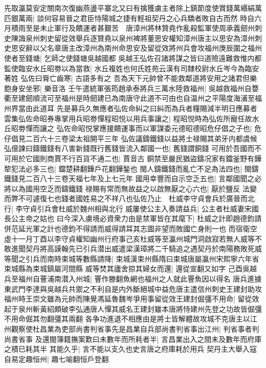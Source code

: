 先取瀛莫安定關南次復幽燕盪平寨北又曰有擒獲虜主者除上鎮節度使賞錢萬緡絹萬匹銀萬兩|{
	談何容易晉之君臣恃陽城之捷有輕祖契丹之心兵驕者敗自古而然}
時自六月積雨至是未止軍行及饋運者甚艱苦　唐漳州將林贊堯作亂殺監軍使周承義劒州刺史陳誨泉州刺史留從效舉兵逐贊堯以泉州裨將董思安權知漳州唐主以思安為漳州刺史思安辭以父名章唐主改漳州為南州命思安及留從效將州兵會攻福州庚辰圍之福州使者至錢塘|{
	乞師之使錢塘吳越國都}
吳越王弘佐召諸將謀之皆曰道險遠難救惟内都監使臨安水丘昭劵以為當救|{
	水丘複姓也何氏姓苑云漢有司隸校尉水丘岑今為臨安著姓}
弘佐曰脣亡齒寒|{
	古語多有之}
吾為天下元帥曾不能救鄰道將安用之諸君但樂飽身安坐邪|{
	樂音洛}
壬午遣統軍張筠趙承泰將兵三萬水陸救福州|{
	吳越救福州自㜈衢至建劒順流可至福州是時劒建已為南唐守此道不可由也自温州之平陽度海浦至福州界當由此道耳}
先是募兵久無應者弘佐命糾之曰糾而為兵者糧賜減半明日應募者雲集弘佐命昭券專掌用兵昭劵憚程昭悦以用兵事讓之|{
	程昭悦時為弘佐所寵任故水丘昭劵憚而讓之}
弘佐命昭悦掌應援饋運事而以軍謀委元德昭德昭危仔倡之子也|{
	危仔倡見二百六十三卷梁太祖開平三年}
弘佐議鑄鐵錢以益將士禄賜其弟牙内都虞候弘億諫曰鑄鐵錢有八害新錢既行舊錢皆流入鄰國一也|{
	舊錢謂銅錢}
可用於吾國而不可用於它國則商賈不行百貨不通二也|{
	賈音古}
銅禁至嚴民猶盜鑄况家有鐺釜野有鏵犂犯法必多三也|{
	鐺楚耕翻鏵戶花翻鏵鍫也}
閩人鑄鐵錢而亂亡不足為法四也|{
	閩鑄鐵錢見二百八十三卷天福七年及上七元年}
國用幸豐而自示空乏五也|{
	言鄰國聞之必將以為國用空乏而鑄鐵錢}
禄賜有常而無故益之以啟無厭之心六也|{
	厭於鹽反}
法變而弊不可遽復七也錢者國姓易之不祥八也弘佐乃止　杜威李守貞會兵於廣晉而北行|{
	李守貞引兵會杜威於魏州相與北行}
威屢使公主入奏請益兵|{
	公主者杜威妻宋國長公主帝之姑也}
曰今深入虜境必資衆力由是禁軍皆在其麾下|{
	杜威之計即趙德鈞請併范延光軍之計也德鈞不得請而威得請耳其志圖非望而敗國亡身則一也}
而宿衛空虛十一月丁酉以李守貞權知幽州行府事己亥杜威等至瀛州城門洞啟寂若無人威等不敢進聞契丹將高謨翰先已引兵潜出威遣梁漢璋將二千騎追之遇契丹於南陽務敗死威等聞之引兵而南時束城等數縣請降|{
	束城漢束州縣隋曰束城唐屬瀛州宋熙寧六年省束城縣為束城鎮屬河間縣}
威等焚其廬舍掠其婦女而還|{
	還從宣翻又如字}
己酉吳越兵至福州自罾浦南潜入州城|{
	罾作滕翻魚網也福州之人就此罾魚因以得名}
唐兵進據東武門李達與吳越兵共禦之不利自是内外斷絕城中益危唐主遣信州刺史王建封助攻福州時王崇文雖為元帥而陳覺馮延魯魏岑爭用事留從效王建封倔彊不用命|{
	留從效起于泉州斬黃紹頗破李弘通唐人憚其威名王建封雖本唐將恃建州先登之功故皆倔彊不用命倔其勿翻彊其兩翻}
各争功進退不相應由是將士皆解體故攻城不克唐主以江州觀察使杜昌業為吏部尚書判省事先是昌業自兵部尚書判省事出江州|{
	判省事者判尚書省事}
及還閱簿籍撫案歎曰未數年而所耗者半|{
	言昌業出入之間未及數年而府庫之積已耗其半}
其能久乎|{
	言不能以支久也史言唐之府庫耗於用兵}
契丹主大舉入寇自易定趣恒州|{
	趣七喻翻恒戶登翻}
